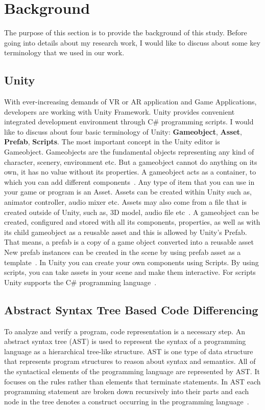 \chapter{Background}
\label{chapter:background}
The purpose of this section is to provide the background of this study. Before going into details about my research work, I would like to discuss about some key terminology that we used in our work.

\section{Unity}
With ever-increasing demands of VR or AR application and Game Applications, developers are working with Unity Framework. Unity provides convenient integrated development environment through C\# programming scripts. I would like to discuss about four basic terminology of Unity: \textbf{Gameobject}, \textbf{Asset}, \textbf{Prefab}, \textbf{Scripts}. The most important concept in the Unity editor is Gameobject. Gameobjects are the fundamental objects representing any kind of character, scenery, environment etc. But a gameobject cannot do anything on its own, it has no value without its properties. A gameobject acts as a container, to which you can add different components~\cite{Gameobject}. Any type of item that you can use in your game or program is an Asset. Assets can be created within Unity such as, animator controller, audio mixer etc. Assets may also come from a file that is created outside of Unity, such as, 3D model, audio file etc~\cite{Asset}. A gameobject can be created, configured and stored with all its components, properties, as well as with its child gameobject as a reusable asset and this is allowed by Unity's Prefab. That means, a prefab is a copy of a game object converted into a reusable asset New prefab instances can be created in the scene by using prefab asset as a template~\cite{Prefab}. In Unity you can create your own components using Scripts. By using scripts, you can take assets in your scene and make them interactive. For scripts Unity supports the C\# programming language~\cite{Script}.

\section{Abstract Syntax Tree Based Code Differencing}
To analyze and verify a program, code representation is a necessary step. An abstract syntax tree (AST) is used to represent the syntax of a programming language as a hierarchical tree-like structure. AST is one type of data structure that represents program structures to reason about syntax and semantics. All of the syntactical elements of the programming language are represented by AST. It focuses on the rules rather than elements that terminate statements. In AST each programming statement are broken down recursively into their parts and each node in the tree denotes a construct occurring in the programming language~\cite{Koyuncu}.

